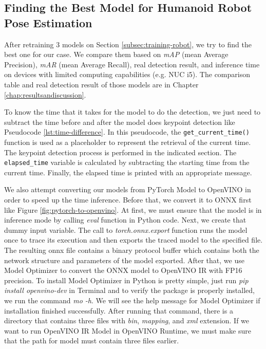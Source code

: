 \subsection{Finding the Best Model for Humanoid Robot Pose Estimation}
\label{subsec:finding-best-model-humanoid-robot}

After retraining 3 models on Section \ref{subsec:training-robot}, we try to find the best one for our case. We compare them based on \emph{mAP} (mean Average Precision), \emph{mAR} (mean Average Recall),
real detection result, and inference time on devices with limited computing capabilities (e.g. NUC i5).
The comparison table and real detection result of those models are in Chapter \ref{chap:resultsandiscussion}.

To know the time that it takes for the model to do the detection, we just need to subtract the time before and after the model does keypoint detection like Pseudocode \ref{lst:time-difference}.
In this pseudocode, the \verb|get_current_time()| function is used as a placeholder to represent the retrieval of the current time. The keypoint detection process is performed in the indicated section.
The \verb|elapsed_time| variable is calculated by subtracting the starting time from the current time. Finally, the elapsed time is printed with an appropriate message.

We also attempt converting our models from PyTorch Model to OpenVINO in order to speed up the time inference. Before that, we convert it to ONNX first like Figure \ref{fig:pytorch-to-openvino}.
At first, we must ensure that the model is in inference mode by calling \emph{eval} function in Python code.
Next, we create that dummy input variable. The call to \emph{torch.onnx.export} function runs the model once to trace its execution and then exports the traced model to the specified file.
The resulting onnx file contains a binary protocol buffer which contains both the network structure and parameters of the model exported.
After that, we use Model Optimizer to convert the ONNX model to OpenVINO IR with FP16 precision. To install Model Optimizer in Python is pretty simple, just run
\emph{pip install openvino-dev} in Terminal and to verify the package is properly installed, we run the command \emph{mo -h}. We will see the help message for Model Optimizer if installation finished successfully.
After running that command, there is a directory that contains three files with \emph{bin}, \emph{mapping}, and \emph{xml} extension.
If we want to run OpenVINO IR Model in OpenVINO Runtime, we must make sure that the path for model must contain three files earlier.

